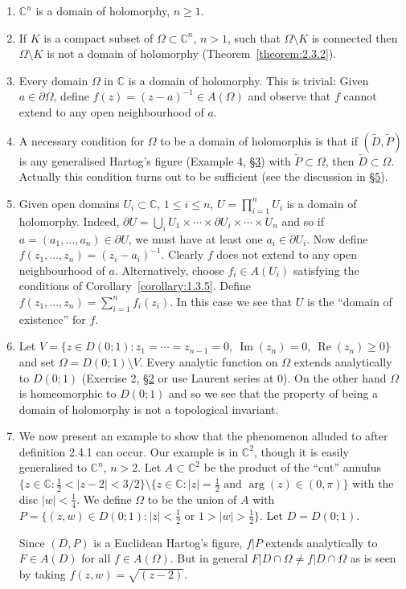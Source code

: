 \begin{enumerate}
\item $\mathbb C^n$ is a domain of holomorphy, $n\geq1$.
\item If $K$ is a compact subset of $\Omega\subset\mathbb C^n$, $n>1$, such that $\Omega\setminus K$ is connected then $\Omega\setminus K$ is not a domain of holomorphy (Theorem~\ref{theorem:2.3.2}).
\item Every domain $\Omega$ in $\mathbb C$ is a domain of holomorphy. This is trivial: Given $a\in\partial\Omega$, define $f(z)=(z-a)^{-1}\in A(\Omega)$ and observe that $f$ cannot extend to any open neighbourhood of $a$.
\item A necessary condition for $\Omega$ to be a domain of holomorphis is that if $(\widetilde D,\widetilde P)$ is any generalised Hartog's figure (Example 4, \hyperref[sec:2:3]{\S3}) with $\widetilde P\subset\Omega$, then $\widetilde D\subset\Omega$. Actually this condition turns out to be sufficient (see the discussion in \hyperref[sec:2:5]{\S5}).
\item Given open domains $U_i\subset\mathbb C$, $1\leq i\leq n$, $U=\prod_{i=1}^n U_i$ is a domain of holomorphy. Indeed, $\partial U=\bigcup_i U_1\times\cdots\times\partial U_i\times\cdots\times U_n$ and so if $a=(a_1,\ldots,a_n)\in\partial U$, we must have at least one $a_i\in\partial U_i$. Now define $f(z_1,\ldots,z_n)=(z_i-a_i)^{-1}$. Clearly $f$ does not extend to any open neighbourhood of $a$. Alternatively, choose $f_i\in A(U_i)$ satisfying the conditions of Corollary~\ref{corollary:1.3.5}. Define $f(z_1,\ldots,z_n)=\sum_{i=1}^n f_i(z_i)$. In this case we see that $U$ is the ``domain of existence'' for $f$.
\item Let $V=\{z\in D(0;1):z_1=\cdots=z_{n-1}=0,\ \operatorname{Im}(z_n)=0,\ \operatorname{Re}(z_n)\geq0\}$ and set $\Omega=D(0;1)\setminus V$. Every analytic function on $\Omega$ extends analytically to $D(0;1)$ (Exercise 2, \hyperref[sec:2:2]{\S2} or use Laurent series at 0). On the other hand $\Omega$ is homeomorphic to $D(0;1)$ and so we see that the property of being a domain of holomorphy is not a topological invariant.
\item We now present an example to show that the phenomenon alluded to after definition 2.4.1 can occur. Our example is in $\mathbb C^2$, though it is easily generalised to $\mathbb C^n$, $n>2$. Let $A\subset\mathbb C^2$ be the product of the ``cut'' annulus $\{z\in\mathbb C:\tfrac12<|z-2|<3/2\}\setminus\{z\in\mathbb C:|z|=\tfrac12\text{ and }\arg(z)\in(0,\pi)\}$ with the disc $|w|<\tfrac14$. We define $\Omega$ to be the union of $A$ with $P=\{(z,w)\in D(0;1):|z|<\tfrac12\text{ or }1>|w|>\tfrac12\}$. Let $D=D(0;1)$.
\begin{center}
    \begin{minipage}{\linewidth}
        \centering
        
    \end{minipage}
\end{center}
Since $(D,P)$ is a Euclidean Hartog's figure, $f|P$ extends analytically to $F\in A(D)$ for all $f\in A(\Omega)$. But in general $F|D\cap\Omega\neq f|D\cap\Omega$ as is seen by taking $f(z,w)=\sqrt{(z-2)}$.
\end{enumerate}
